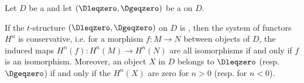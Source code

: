 \begin{proposition} \label{proposition:non_degenerate_t_structures_have_conservative_cohomology_functors}
    Let $D$ be a  and let $(\Dleqzero, \Dgeqzero)$ be a  on $D$.

    If the $t$-structure $(\Dleqzero, \Dgeqzero)$ on $D$ is , then the system of functors $H^n$ is conservative, i.e. for a morphism $f: M \to N$ between objects of $D$, the induced maps $H^n(f): H^n(M) \to H^n(N)$ are all isomorphisms if and only if $f$ is an isomorphism. Moreover, an object $X$ in $D$ belongs to $\Dleqzero$ (resp. $\Dgeqzero$) if and only if the $H^n(X)$ are zero for $n > 0$ (resp. for $n < 0$).
\end{proposition}